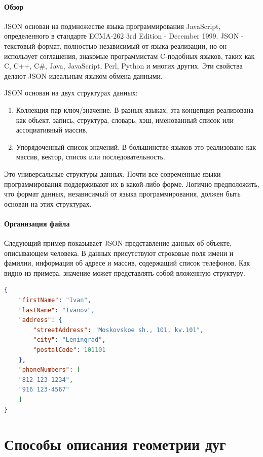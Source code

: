 \paragraph{Обзор}
\nopagebreak

JSON основан на подмножестве языка программирования JavaScript, определенного в стандарте ECMA-262 3rd Edition - December 1999. JSON - текстовый формат, полностью независимый от языка реализации, но он использует соглашения, знакомые программистам C-подобных языков, таких как C, C++, C\#, Java, JavaScript, Perl, Python и многих других. Эти свойства делают JSON идеальным языком обмена данными.

JSON основан на двух структурах данных:
\begin{enumerate}[1)]
	\item Коллекция пар ключ/значение. В разных языках, эта концепция реализована как объект, запись, структура, словарь, хэш, именованный список или ассоциативный массив, 
	\item Упорядоченный список значений. В большинстве языков это реализовано как массив, вектор, список или последовательность.
\end{enumerate}

Это универсальные структуры данных. Почти все современные языки программирования поддерживают их в какой-либо форме. Логично предположить, что формат данных, независимый от языка программирования, должен быть основан на этих структурах.

\paragraph{Организация файла}
\nopagebreak

Следующий пример показывает JSON-представление данных об объекте, описывающем человека. В данных присутствуют строковые поля имени и фамилии, информация об адресе и массив, содержащий список телефонов. Как видно из примера, значение может представлять собой вложенную структуру.
\begin{lstlisting}[language=json,label=list:json]
{
	"firstName": "Ivan",
	"lastName": "Ivanov",
	"address": {
		"streetAddress": "Moskovskoe sh., 101, kv.101",
		"city": "Leningrad",
		"postalCode": 101101
	},
	"phoneNumbers": [
	"812 123-1234",
	"916 123-4567"
	]
}
\end{lstlisting}

\section{Способы описания геометрии дуг} \label{sec:arcs}

